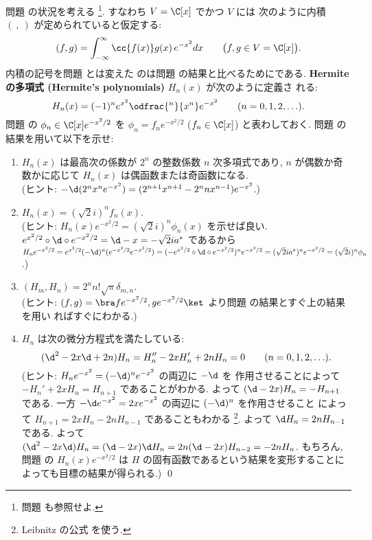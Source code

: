 \documentclass[12pt,twoside]{jarticle}
\begin{document}
\begin{question}
  問題  の状況を考える%
  \footnote{問題  も参照せよ.}.
  すなわち $V=\C[x]$ でかつ $V$ には
  次のように内積 $(\ ,\ )$ が定められていると仮定する:
  \begin{equation*}
    (f, g) = \int_{-\infty}^\infty \cc{f(x)}g(x)\,e^{-x^2}dx
    \qquad \bigl(f,g\in V=\C[x]\bigr).
  \end{equation*}
  内積の記号を問題  とは変えた
  のは問題  の結果と比べるためにである.
  {\bf Hermite の多項式 (Hermite's polynomials)} $H_n(x)$ が次のように定義さ
  れる:
  \begin{equation*}
    H_n(x) = (-1)^n e^{x^2} \odfrac{^n}{x^n}e^{-x^2}
    \qquad (n=0,1,2,\ldots).
  \end{equation*}
  問題  の $\phi_n\in\C[x]e^{-x^2/2}$ 
  を $\phi_n = f_n e^{-x^2/2}$ ($f_n\in\C[x]$) と表わしておく.
  問題  の結果を用いて以下を示せ:
  \begin{enumerate}
  \item $H_n(x)$ は最高次の係数が $2^n$ の整数係数 $n$ 次多項式であり, 
    $n$ が偶数か奇数かに応じて $H_n(x)$ は偶函数または奇函数になる.
    \\(ヒント: $-\d(2^nx^n e^{-x^2}) 
    = (2^{n+1}x^{n+1} - 2^n n x^{n-1})e^{-x^2}$.)
  \item $H_n(x) = (\sqrt{2}i)^n f_n(x)$.
    \\(ヒント: $H_n(x)e^{-x^2/2}= (\sqrt{2}i)^n \phi_n(x)$ を示せば良い.
    $e^{x^2/2}\circ\d\circ e^{-x^2/2} = \d - x = -\sqrt{2}ia^*$
    であるから $H_n e^{-x^2/2} = e^{x^2/2}(-\d)^n(e^{-x^2/2}e^{-x^2/2})
    = (-e^{x^2/2}\circ\d\circ e^{-x^2/2})^ne^{-x^2/2}
    = (\sqrt{2}ia^*)^n e^{-x^2/2}
    = (\sqrt{2}i)^n \phi_n$.)
  \item $(H_m, H_n)=2^n n!\sqrt{\pi} \delta_{m,n}$.
    \\(ヒント: $(f,g)=\bra fe^{-x^2/2}, ge^{-x^2/2}\ket$ 
    より問題  の結果とすぐ上の結果を用い
    ればすぐにわかる.)
  \item $H_n$ は次の微分方程式を満たしている:
    \begin{equation*}
      (\d^2 - 2x\d + 2n)H_n
      = H_n'' - 2 x H_n' + 2n H_n
      = 0
      \qquad (n=0,1,2,\ldots).
    \end{equation*}
    (ヒント: $H_n e^{-x^2} = (-\d)^n e^{-x^2}$ の両辺に $-\d$ を
    作用させることによって $- H_n' + 2x H_n = H_{n+1}$ であることがわかる.
    よって $(\d-2x)H_n = -H_{n+1}$ である.
    一方 $-\d e^{-x^2} = 2x e^{-x^2}$ の両辺に $(-\d)^n$ を作用させること
    によって $H_{n+1} = 2x H_n - 2n H_{n-1}$ であることもわかる%
    \footnote{Leibnitz の公式  を使う.}.
    よって $\d H_n = 2n H_{n-1}$ である.
    よって $(\d^2 - 2x\d)H_n = (\d-2x)\d H_n = 2n(\d-2x)H_{n-2} = -2n H_n$.
    もちろん, 問題  
    の $H_n(x)e^{-x^2/2}$ は $H$ の固有函数であるという結果を変形することに
    よっても目標の結果が得られる.) 
    \qed
  \end{enumerate}
\end{question}
\end{document}
